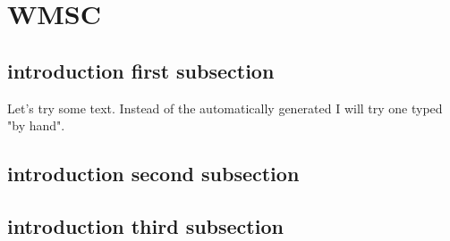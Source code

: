 \documentclass[crop=false]{standalone}
\begin{document}
\section{WMSC}

\subsection{introduction first subsection}
Let's try some text. Instead of the automatically generated
I will try one typed "by hand".

\subsection{introduction second subsection}


\subsection{introduction third subsection}

\end{document}
